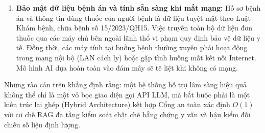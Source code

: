 \begin{enumerate}[leftmargin=2em]
    \item \textbf{Bảo mật dữ liệu bệnh án và tính sẵn sàng khi mất mạng:}
    Hồ sơ bệnh án và thông tin dùng thuốc của người bệnh là dữ liệu tuyệt mật theo Luật Khám bệnh, chữa bệnh số 15/2023/QH15. Việc truyền toàn bộ dữ liệu đơn thuốc qua các máy chủ bên ngoài lãnh thổ vi phạm quy định bảo vệ dữ liệu y tế. Đồng thời, các máy tính tại buồng bệnh thường xuyên phải hoạt động trong mạng nội bộ (LAN cách ly) hoặc gặp tình huống mất kết nối Internet. Mô hình AI dựa hoàn toàn vào đám mây sẽ tê liệt khi không có mạng.
\end{enumerate}

Những rào cản trên khẳng định rằng: một hệ thống hỗ trợ lâm sàng hiệu quả không thể chỉ là một vỏ bọc giao diện gọi API LLM, mà bắt buộc phải là một kiến trúc lai ghép (Hybrid Architecture) kết hợp Cổng an toàn xác định $O(1)$ với cơ chế RAG đa tầng kiểm soát chặt chẽ bằng chứng y văn và hậu kiểm đối chiếu số liệu định lượng.
